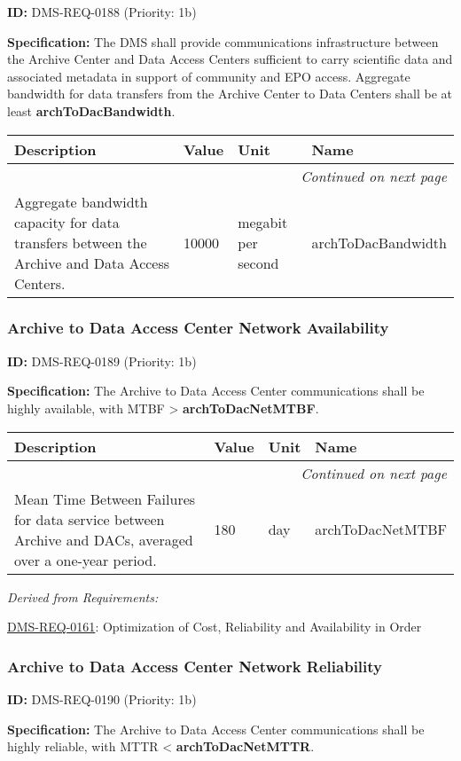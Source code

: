 \documentclass[SE,toc,lsstdraft]{lsstdoc}
\makeatletter
\newcommand{\paramname}[1]{\hspace{0pt}#1}
\newcommand{\unitname}[1]{\hspace{0pt}#1}
\newenvironment{parameters}[0]{%
\setlength\LTleft{0pt}
\setlength\LTright{\fill}
\begin{small}
\begin{longtable}[]{|p{0.49\textwidth}|l|p{0.6in}|p{1.70in}@{}|}

\hline \textbf{Description} & \textbf{Value} & \textbf{Unit} & \textbf{Name} \\ \hline
\endhead

\hline \multicolumn{4}{r}{\emph{Continued on next page}} \\
\endfoot

\hline\hline
\endlastfoot
}{%
\hline
\end{longtable}
\end{small}
}
\makeatother
\begin{document}
\label{DMS-REQ-0188}
\textbf{ID:} DMS-REQ-0188 (Priority: 1b)

\textbf{Specification:} The DMS shall provide communications infrastructure between the Archive Center and Data Access Centers sufficient to carry scientific data and associated metadata in support of community and EPO access. Aggregate bandwidth for data transfers from the Archive Center to Data Centers shall be at least \textbf{archToDacBandwidth}.

\begin{parameters}
Aggregate bandwidth capacity for data transfers between the Archive and Data Access Centers.
&
10000
&
\unitname{%
megabit per second
}
&
\paramname{%
archToDacBandwidth
} \\\hline
\end{parameters}

\subsubsection{Archive to Data Access Center Network Availability}

\label{DMS-REQ-0189}
\textbf{ID:} DMS-REQ-0189 (Priority: 1b)

\textbf{Specification:} The Archive to Data Access Center communications shall be highly available, with MTBF > \textbf{archToDacNetMTBF}.

\begin{parameters}
Mean Time Between Failures for data service between Archive and DACs, averaged over a one-year period.
&
180
&
\unitname{%
day
}
&
\paramname{%
archToDacNetMTBF
} \\\hline
\end{parameters}

\emph{Derived from Requirements:}

\hyperref[DMS-REQ-0161]{DMS-REQ-0161}:
Optimization of Cost, Reliability and Availability in Order \newline

\subsubsection{Archive to Data Access Center Network Reliability}

\label{DMS-REQ-0190}
\textbf{ID:} DMS-REQ-0190 (Priority: 1b)

\textbf{Specification:} The Archive to Data Access Center communications shall be highly reliable, with MTTR < \textbf{archToDacNetMTTR}.
\end{document}
